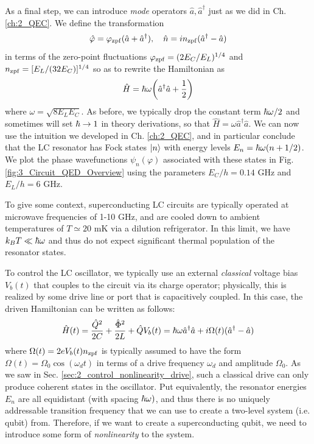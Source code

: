 As a final step, we can introduce \textit{mode} operators $\hat{a}, \hat{a}^\dagger$ just as we did in Ch. \ref{ch:2_QEC}. We define the transformation
\begin{equation}
    \hat{\varphi} = \varphi_{\rm zpf}(\hat{a} + \hat{a}^\dagger), \quad \hat{n} = in_{\rm zpf}(\hat{a}^\dagger - \hat{a})
\end{equation}
in terms of the zero-point fluctuations $\varphi_{\rm zpf} = (2E_C/E_L)^{1/4}$ and $n_{\rm zpf} =  [E_L/(32E_C)]^{1/4}$ so as to rewrite the Hamiltonian as
\begin{equation}
    \hat{H} = \hbar\omega\bigg(\hat{a}^\dagger\hat{a} + \frac{1}{2}\bigg)
    \label{eq:3_LC_QHO}
\end{equation}
where $\omega = \sqrt{8 E_LE_C}$. As before, we typically drop the constant term $\hbar\omega/2$ and sometimes will set $\hbar\to 1$ in theory derivations, so that $\hat{H} = \omega\hat{a}^\dagger\hat{a}$. We can now use the intuition we developed in Ch. \ref{ch:2_QEC}, and in particular conclude that the LC resonator has Fock states $\lvert n\rangle$ with energy levels $E_n = \hbar\omega(n+1/2)$. We plot the phase wavefunctions $\psi_n(\varphi)$ associated with these states in Fig. \ref{fig:3_Circuit_QED_Overview} using the parameters $E_C/h = 0.14$ GHz and $E_L/h = 6$ GHz. 

To give some context, superconducting LC circuits are typically operated at microwave frequencies of 1-10 GHz, and are cooled down to ambient temperatures of $T \simeq 20$ mK via a dilution refrigerator. In this limit, we have $k_BT \ll \hbar\omega$ and thus do not expect significant thermal population of the resonator states. 

To control the LC oscillator, we typically use an external \textit{classical} voltage bias $V_b(t)$ that couples to the circuit via its charge operator; physically, this is realized by some drive line or port that is capacitively coupled. In this case, the driven Hamiltonian can be written as follows:
\begin{equation}
    \hat{H}(t) = \frac{\hat{Q}^2}{2C} + \frac{\hat{\Phi}^2}{2L} + \hat{Q}V_b(t) = \hbar\omega\hat{a}^\dagger\hat{a} + i\Omega(t) (\hat{a}^\dagger - \hat{a})
\end{equation}
where $\Omega(t) = 2eV_b(t)n_{\rm zpf}$ is typically assumed to have the form $\Omega(t) = \Omega_0\cos(\omega_d t)$ in terms of a drive frequency $\omega_d$ and amplitude $\Omega_0$. As we saw in Sec. \ref{sec:2_control_nonlinearity_drive}, such a classical drive can only produce coherent states in the oscillator. Put equivalently, the resonator energies $E_n$ are all equidistant (with spacing $\hbar\omega)$, and thus there is no uniquely addressable transition frequency that we can use to create a two-level system (i.e. qubit) from. Therefore, if we want to create a superconducting qubit, we need to introduce some form of \textit{nonlinearity} to the system. 


